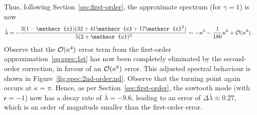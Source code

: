 \documentclass[12pt,a5paper]{article}
\newcommand{\bcurs}[1]{\text{$\mathscr{#1}$}}
\begin{document}
Thus, following Section~\ref{sec:first-order}, the approximate spectrum (for $\gamma=1$) is now
\begin{eqnarray}
\bar{\lambda} = -\frac{3(1-\bcurs{c})(32+41\bcurs{c}+17\bcurs{c}^2)}{5(2+\bcurs{c})^3}
\sim -\kappa^2-\frac{1}{180}\kappa^6+{\cal O}(\kappa^8)\,.
\end{eqnarray}
Observe that the ${\cal O}(\kappa^4)$ error term from the first-order approximation~\eqref{eq:spec:1st} has now been
completely eliminated by the second-order correction, in favour of an ${\cal O}(\kappa^6)$ error. 
This adjusted spectral behaviour is shown in Figure~\ref{fig:spec:2nd-order:nd}.
Observe that the turning point again occurs at $\kappa=\pi$. Hence,
as per Section~\ref{sec:first-order},
the sawtooth mode (with $\bcurs{c}=-1$) now has a decay rate of $\bar{\lambda}=-9.6$, leading to an error of
$\Delta\bar{\lambda}\approx 0.27$, which is an order of magnitude smaller than the first-order error.
\end{document}
